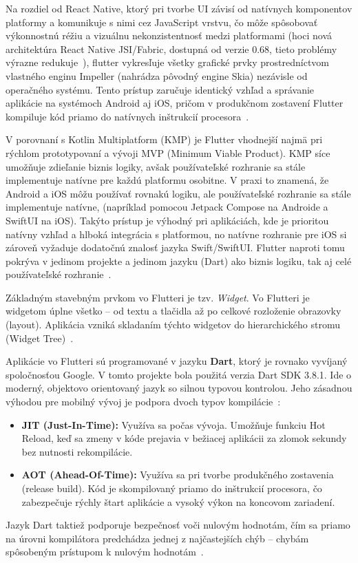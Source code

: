 Na rozdiel od React Native, ktorý pri tvorbe UI závisí od natívnych komponentov
platformy a komunikuje s nimi cez JavaScript vrstvu, čo môže spôsobovať
výkonnostnú réžiu a vizuálnu nekonzistentnosť medzi platformami (hoci nová architektúra React Native JSI/Fabric, dostupná od verzie 0.68, tieto problémy výrazne redukuje~\cite{rn_new_arch}), flutter vykresľuje všetky grafické prvky prostredníctvom vlastného enginu
Impeller (nahrádza pôvodný
engine Skia) nezávisle od operačného systému. Tento prístup zaručuje identický
vzhľad a správanie aplikácie na systémoch Android aj iOS, pričom v produkčnom zostavení Flutter kompiluje kód priamo do natívnych inštrukcií procesora~\cite{flutter_architecture}.

V porovnaní s Kotlin Multiplatform (KMP) je Flutter vhodnejší najmä pri rýchlom prototypovaní a vývoji MVP (Minimum Viable Product). KMP síce umožňuje zdieľanie biznis logiky, avšak používateľské rozhranie sa stále implementuje natívne pre každú platformu osobitne. V praxi to znamená, že Android a iOS môžu používať rovnakú logiku, ale používateľské rozhranie sa stále implementuje natívne, (napríklad pomocou Jetpack Compose na Androide a SwiftUI na iOS). Takýto prístup je výhodný pri aplikáciách, kde je prioritou natívny vzhľad a hlboká integrácia s platformou, no natívne rozhranie pre iOS si zároveň vyžaduje dodatočnú znalosť jazyka Swift/SwiftUI. Flutter naproti tomu pokrýva v jedinom projekte a jedinom jazyku (Dart) ako biznis logiku, tak aj celé používateľské rozhranie~\cite{kmp}.

Základným stavebným prvkom vo Flutteri je tzv. \textit{Widget}. Vo Flutteri je widgetom úplne všetko – od textu a tlačidla až po celkové rozloženie obrazovky (layout). Aplikácia vzniká skladaním týchto widgetov do hierarchického stromu (Widget Tree)~\cite{flutter_widget_tree}.

Aplikácie vo Flutteri sú programované v jazyku \textbf{Dart}, ktorý je rovnako vyvíjaný spoločnosťou Google. V tomto projekte bola použitá verzia Dart SDK 3.8.1. Ide o moderný, objektovo orientovaný jazyk so silnou typovou kontrolou. Jeho zásadnou výhodou pre mobilný vývoj je podpora dvoch typov kompilácie~\cite{dart2024overview}:
\begin{itemize}
    \item \textbf{JIT (Just-In-Time):} Využíva sa počas vývoja. Umožňuje funkciu Hot Reload, keď sa zmeny v kóde prejavia v bežiacej aplikácii za zlomok sekundy bez nutnosti rekompilácie.
    \item \textbf{AOT (Ahead-Of-Time):} Využíva sa pri tvorbe produkčného zostavenia (release build). Kód je skompilovaný priamo do inštrukcií procesora, čo zabezpečuje rýchly štart aplikácie a vysoký výkon na koncovom zariadení.
\end{itemize}
Jazyk Dart taktiež podporuje bezpečnosť voči nulovým hodnotám, čím sa priamo na úrovni kompilátora predchádza jednej z najčastejších chýb – chybám spôsobeným prístupom k nulovým hodnotám~\cite{dart2024nullsafety}.


